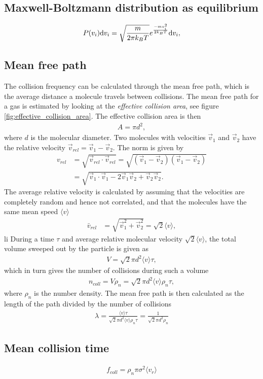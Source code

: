 \subsection{Maxwell-Boltzmann distribution as equilibrium}
\label{sec:maxwell_boltzmann_distribution}
\begin{align}
	\label{eq:maxwell_boltzmann_distribution}
	P(v_i)\mathrm{d}v_i = \sqrt\frac{m}{ 2\pi k_BT}e^\frac{-mv_i^2}{ 2k_BT}\mathrm{d}v_i,
\end{align}
\subsection{Mean free path}
\label{sec:mean_free_path_calculation}
The collision frequency can be calculated through the mean free path, which is the average distance a molecule travels between collisions. The mean free path for a gas is estimated by looking at the \textit{effective collision area}, see figure \ref{fig:effective_collision_area}. The effective collision area is then
\begin{align}
	A = \pi d^2,
\end{align}
where $d$ is the molecular diameter. Two molecules with velocities $\vec v_1$ and $\vec v_2$ have the relative velocity $\vec v_{rel} = \vec v_1 - \vec v_2$. The norm is given by
\begin{align}
	v_{rel} &= \sqrt{\vec v_{rel}\cdot \vec v_{rel} } = \sqrt{ (\vec v_1 - \vec v_2)(\vec v_1 - \vec v_2)}\\
	&= \sqrt{\vec v_1\cdot \vec v_1 - 2\vec v_1\vec v_2 + \vec v_2\vec v_2}.
\end{align}
The average relative velocity is calculated by assuming that the velocities are completely random and hence not correlated, and that the molecules have the same mean speed $\langle v\rangle$
\begin{align}
	\bar v_{rel} &= \sqrt{\vec v_1^2 + \vec v_2^2} = \sqrt 2 \langle v\rangle,
\end{align}li
During a time $\tau$ and average relative molecular velocity $\sqrt 2 \langle v\rangle$, the total volume sweeped out by the particle is given as
\begin{align}
	V = \sqrt 2 \pi d^2\langle v\rangle \tau,
\end{align}
which in turn gives the number of collisions during such a volume
\begin{align}
	\label{eq:num_collisions}
	n_{coll} = V\rho_n = \sqrt 2 \pi d^2\langle v\rangle \rho_n \tau,
\end{align}
where $\rho_n$ is the number density. The mean free path is then calculated as the length of the path divided by the number of collisions
\begin{align}
	\label{eq:mean_free_path}
	\lambda = \frac{\langle v\rangle \tau}{ \sqrt 2 \pi d^2\langle v\rangle \rho_n\tau} = \frac{1 }{ \sqrt 2 \pi d^2 \rho_n}
\end{align}
\subsection{Mean collision time}
\begin{align}
	\label{eq:coll_frequency}
	f_{coll} = \rho_n \pi \sigma^2 \langle v_r \rangle
\end{align}